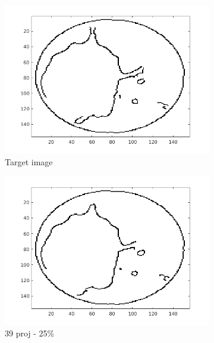 \documentclass[10pt,a4paper,titlepage]{article}
\begin{document}
\begin{figure}[H]
        	
        	\begin{subfigure}[b]{0.32\textwidth}   
        	    \centering 
            	\includegraphics[width=\textwidth]{Sample1/Edges/target_0_10.png}
            	\caption{Target image}
        	\end{subfigure}
        	\begin{subfigure}[b]{0.32\textwidth}   
        	    \centering 
        	    \includegraphics[width=\textwidth]{Sample1/Edges/SB/p3_0_10.png}
        	    \caption{39 proj - 25\%}    
        	    \label{subfig:39p1L-D}
       		\end{subfigure}
        	\begin{subfigure}[b]{0.32\textwidth}  

\end{subfigure}
\end{figure}
\end{document}
